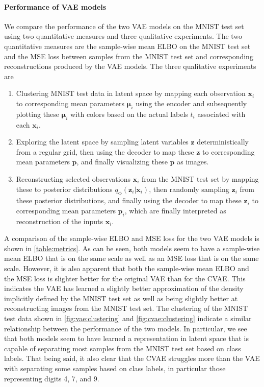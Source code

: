 \paragraph{Performance of VAE models}
We compare the performance of the two VAE models on the MNIST test set using two quantitative measures and three qualitative experiments. The two quantitative measures are the sample-wise mean ELBO on the MNIST test set and the MSE loss between samples from the MNIST test set and corresponding reconstructions produced by the VAE models. The three qualitative experiments are
\begin{enumerate}
    \item Clustering MNIST test data in latent space by mapping each observation $\mathbf{x}_i$ to corresponding mean parameters $\bm{\mu}_i$ using the encoder and subsequently plotting these $\bm{\mu}_i$ with colors based on the actual labels $t_i$ associated with each $\mathbf{x}_i$.
    \item Exploring the latent space by sampling latent variables $\mathbf{z}$ deterministically from a regular grid, then using the decoder to map these $\mathbf{z}$ to corresponding mean parameters $\mathbf{p}$,  and finally visualizing these $\mathbf{p}$ as images.
    \item Reconstructing selected observations $\mathbf{x}_i$ from the MNIST test set by mapping these to posterior distributions $q_{\bm{\phi}}(\mathbf{z}_i|\mathbf{x}_i)$, then randomly sampling $\mathbf{z}_i$ from these posterior distributions, and finally using the decoder to map these $\mathbf{z}_i$ to corresponding mean parameters $\mathbf{p}_i$, which are finally interpreted as reconstruction of the inputs $\mathbf{x}_i$.
\end{enumerate}
A comparison of the sample-wise ELBO and MSE loss for the two VAE models is shown in \cref{table:metrics}. As can be seen, both models seem to have a sample-wise mean ELBO that is on the same scale as well as an MSE loss that is on the same scale. However, it is also apparent that both the sample-wise mean ELBO and the MSE loss is slighter better for the original VAE than for the CVAE\@. This indicates the VAE has learned a slightly better approximation of the density implicitly defined by the MNIST test set as well as being slightly better at reconstructing images from the MNIST test set. The clustering of the MNIST test data shown in \cref{fig:vae:clustering} and \cref{fig:cvae:clustering} indicate a similar relationship between the performance of the two models. In particular, we see that both models seem to have learned a representation in latent space that is capable of separating most samples from the MNIST test set based on class labels. That being said, it also clear that the CVAE struggles more than the VAE with separating some samples based on class labels, in particular those representing digits 4, 7, and 9. 

